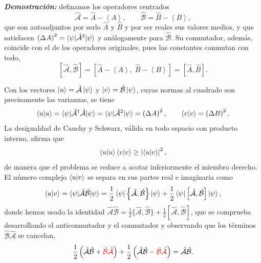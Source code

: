         \textbf{\textit{Demostración:}} definamos los operadores centrados
        \begin{equation}\label{eq:OperadoresCentrados}
            \hat{\mathcal{A}} = \hat{A} - \left\langle A\right\rangle, \qquad \hat{\mathcal{B}} = \hat{B} - \left\langle B\right\rangle,
        \end{equation}
        que son autoadjuntos por serlo $\hat{A}$ y $\hat{B}$ y por ser reales sus valores medios, y que satisfacen $\left(\Delta A\right)^{2} = \braket{\psi|\hat{\mathcal{A}}^{2}|\psi}$ y análogamente para $\hat{\mathcal{B}}$. Su conmutador, además, coincide con el de los operadores originales, pues las constantes conmutan con todo,
        \begin{equation}\label{eq:ConmutadorCentrado}
            \left[\hat{\mathcal{A}},\hat{\mathcal{B}}\right] = \left[\hat{A} - \left\langle A\right\rangle,\;\hat{B} - \left\langle B\right\rangle\right] = \left[\hat{A},\hat{B}\right] .
        \end{equation}

        Con los vectores $\ket{u} = \hat{\mathcal{A}}\ket{\psi}$ y $\ket{v} = \hat{\mathcal{B}}\ket{\psi}$, cuyas normas al cuadrado son precisamente las varianzas, se tiene
        \begin{equation}\label{eq:NormasUV}
            \braket{u|u} = \braket{\psi|\hat{\mathcal{A}}^{\dagger}\hat{\mathcal{A}}|\psi} = \braket{\psi|\hat{\mathcal{A}}^{2}|\psi} = \left(\Delta A\right)^{2},
            \qquad
            \braket{v|v} = \left(\Delta B\right)^{2} .
        \end{equation}
        La desigualdad de Cauchy y Schwarz, válida en todo espacio con producto interno, afirma que
        \begin{equation}\label{eq:CauchySchwarz}
            \braket{u|u}\braket{v|v} \geq \left|\braket{u|v}\right|^{2},
        \end{equation}
        de manera que el problema se reduce a acotar inferiormente el miembro derecho. El número complejo $\braket{u|v}$ se separa en sus partes real e imaginaria como
        \begin{equation}\label{eq:SeparacionZ}
            \braket{u|v} = \braket{\psi|\hat{\mathcal{A}}\hat{\mathcal{B}}|\psi} = \frac{1}{2}\braket{\psi|\left\{\hat{\mathcal{A}},\hat{\mathcal{B}}\right\}|\psi} + \frac{1}{2}\braket{\psi|\left[\hat{\mathcal{A}},\hat{\mathcal{B}}\right]|\psi},
        \end{equation}
        donde hemos usado la identidad $\hat{\mathcal{A}}\hat{\mathcal{B}} = \frac{1}{2}\{\hat{\mathcal{A}},\hat{\mathcal{B}}\} + \frac{1}{2}[\hat{\mathcal{A}},\hat{\mathcal{B}}]$, que se comprueba desarrollando el anticonmutador y el conmutador y observando que los términos $\hat{\mathcal{B}}\hat{\mathcal{A}}$ se cancelan,
        \begin{equation}\label{eq:IdentidadAntiConm}
            \frac{1}{2}\left(\hat{\mathcal{A}}\hat{\mathcal{B}} + \textcolor{red}{\hat{\mathcal{B}}\hat{\mathcal{A}}}\right) + \frac{1}{2}\left(\hat{\mathcal{A}}\hat{\mathcal{B}} - \textcolor{red}{\hat{\mathcal{B}}\hat{\mathcal{A}}}\right) = \hat{\mathcal{A}}\hat{\mathcal{B}} .
        \end{equation}

